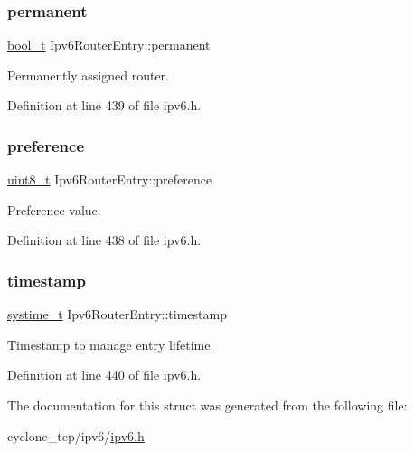 \subsubsection{\texorpdfstring{permanent}{permanent}}
{\footnotesize\ttfamily \hyperlink{compiler__port_8h_a812d16e5494522586b3784e55d479912}{bool\+\_\+t} Ipv6\+Router\+Entry\+::permanent}



Permanently assigned router. 



Definition at line 439 of file ipv6.\+h.

\mbox{\label{structIpv6RouterEntry_ac637f0417fbe667ddb09990a366c8ad8}} 
\subsubsection{\texorpdfstring{preference}{preference}}
{\footnotesize\ttfamily \hyperlink{stdint_8h_aba7bc1797add20fe3efdf37ced1182c5}{uint8\+\_\+t} Ipv6\+Router\+Entry\+::preference}



Preference value. 



Definition at line 438 of file ipv6.\+h.

\mbox{\label{structIpv6RouterEntry_a913df3ea3054f2f7c605e103196d9f65}} 
\subsubsection{\texorpdfstring{timestamp}{timestamp}}
{\footnotesize\ttfamily \hyperlink{compiler__port_8h_ae3e32a98d431a02106616da3071832dd}{systime\+\_\+t} Ipv6\+Router\+Entry\+::timestamp}



Timestamp to manage entry lifetime. 



Definition at line 440 of file ipv6.\+h.



The documentation for this struct was generated from the following file\+:\begin{DoxyCompactItemize}
\item 
cyclone\+\_\+tcp/ipv6/\hyperlink{ipv6_8h}{ipv6.\+h}\end{DoxyCompactItemize}

